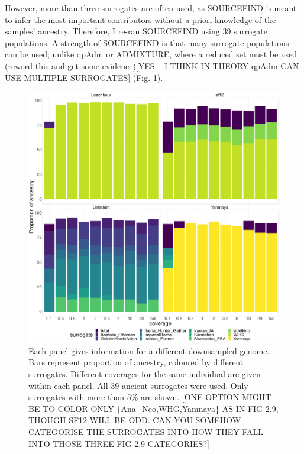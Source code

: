 However, more than three surrogates are often used, as SOURCEFIND is meant to infer the most important contributors without a priori knowledge of the samples' ancestry. Therefore, I re-ran SOURCEFIND using 39 surrogate populations. A strength of SOURCEFIND is that many surrogate populations can be used; unlike qpAdm or ADMIXTURE, {\color{red}where a reduced set must be used (reword this and get some evidence)[YES -- I THINK IN THEORY qpAdm CAN USE MULTIPLE SURROGATES]} (Fig. \ref{fig:SOURCEFIND_AllPSop_downsampled}). 

\begin{figure}[htp]
    \centering
    \includegraphics[width=1.0\textwidth]{../images/chapter1/Allpops_SF_downsampled.pdf}
    \caption{Each panel gives information for a different downsampled genome. Bars represent proportion of ancestry, coloured by different surrogates. Different coverages for the same individual are given within each panel. All 39 ancient surrogates were used. Only surrogates with more than 5\% are shown. {\color{red}[ONE OPTION MIGHT BE TO COLOR ONLY \{Ana\_Neo,WHG,Yamnaya\} AS IN FIG 2.9, THOUGH SF12 WILL BE ODD. CAN YOU SOMEHOW CATEGORISE THE SURROGATES INTO HOW THEY FALL INTO THOSE THREE FIG 2.9 CATEGORIES?]}}
    \label{fig:SOURCEFIND_AllPSop_downsampled}
\end{figure}


